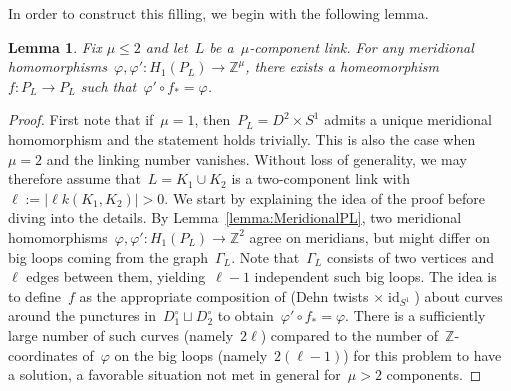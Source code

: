 \documentclass[10.9pt,a4paper]{amsart}
\newtheorem{lemma}[theorem]{Lemma}
\theoremstyle{definition}
\theoremstyle{remark}
\newcommand{\Z}{\mathbb{Z}}
\newcommand{\id}{\operatorname{id}}
\newcommand{\lk}{\ell k}
\begin{document}
\medbreak

In order to construct this filling, we begin with the following lemma.

\begin{lemma}
\label{lem:HomeoPL}
Fix $\mu \leq 2$ and let~$L$ be a~$\mu$-component link.
For any meridional homomorphisms~$\varphi,\varphi'\colon H_1(P_L) \to \Z^\mu$, there exists a homeomorphism~$ f \colon P_L \to P_L$ such that~$\varphi' \circ  f_*=\varphi$.
\end{lemma}
\begin{proof}
First note that if~$\mu=1$, then~$P_L=D^2\times S^1$ admits a unique meridional homomorphism and the statement holds trivially. This is also the case when~$\mu=2$ and the linking number vanishes. Without loss of generality, we may therefore assume that~$L=K_1\cup K_2$ is a two-component link with~$\ell:=\vert\lk(K_1,K_2)\vert>0$.
We start by explaining the idea of the proof before diving into the details.
By Lemma~\ref{lemma:MeridionalPL}, two meridional homomorphisms~$\varphi, \varphi'\colon H_1(P_L)\to\Z^2$
agree on meridians, but might differ on big loops coming from the graph~$\Gamma_L$.
Note that~$\Gamma_L$ consists of two vertices and~$\ell$ edges between them, yielding~$\ell-1$ independent such big loops.
The idea is to define~$ f$ as
the appropriate composition of (Dehn twists $\times\id_{S^1}$) about curves around the punctures in~$D^\circ_1\sqcup D_2^\circ$ to obtain~$\varphi'\circ  f_*=\varphi$.
There is a sufficiently large number of such curves (namely~$2\ell$) compared to the number of~$\Z$-coordinates of~$\varphi$ on the big loops (namely~$2(\ell-1)$)
for this problem to have a solution, a favorable situation not met in general for~$\mu>2$ components.


\end{proof}
\end{document}
